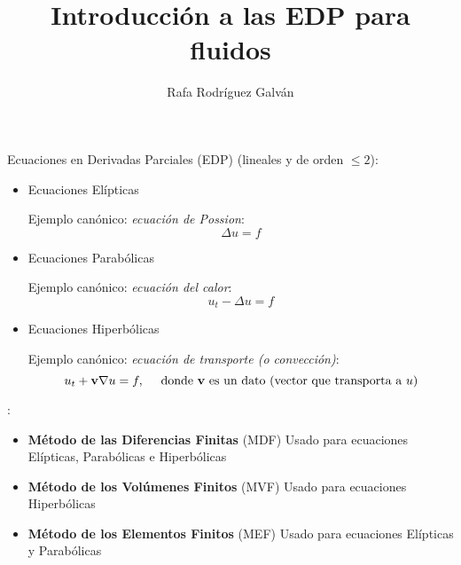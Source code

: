 \documentclass[8pt]{beamer}
\title{Introducción a las EDP para fluidos}
\author{Rafa Rodríguez Galván}
\begin{document}

\begin{frame}
\maketitle
\end{frame}
\begin{frame}{Ecuaciones en Derivadas Parciales (EDP)}
   (lineales y de orden $\le 2$):
  \begin{itemize}
      \item Ecuaciones \alert{Elípticas}
      \par
      Ejemplo canónico: \emph{ecuación de Possion}:
      $$
      \Delta u = f
      $$

      \item Ecuaciones \alert{Parabólicas}
      \par
      Ejemplo canónico: \emph{ecuación del calor}:
      $$
      u_t - \Delta u = f
      $$

      \item Ecuaciones  \alert{Hiperbólicas}
      \par
      Ejemplo canónico: \emph{ecuación de transporte (o convección)}:
      $$
      u_t + \mathbf{v} \nabla u = f, \quad\text{ donde $\mathbf{v}$ es un dato (vector que transporta a $u$)}
      $$
  \end{itemize}

  \textbf{}:
  \begin{itemize}
    \item \textbf{Método de las Diferencias Finitas} (MDF)
      Usado para ecuaciones Elípticas, Parabólicas e Hiperbólicas
    \item \textbf{Método de los Volúmenes Finitos} (MVF)
      Usado para ecuaciones Hiperbólicas
    \item \textbf{Método de los Elementos Finitos} (MEF)
      Usado para ecuaciones Elípticas y Parabólicas
    \end{itemize}
\end{frame}
\end{document}
